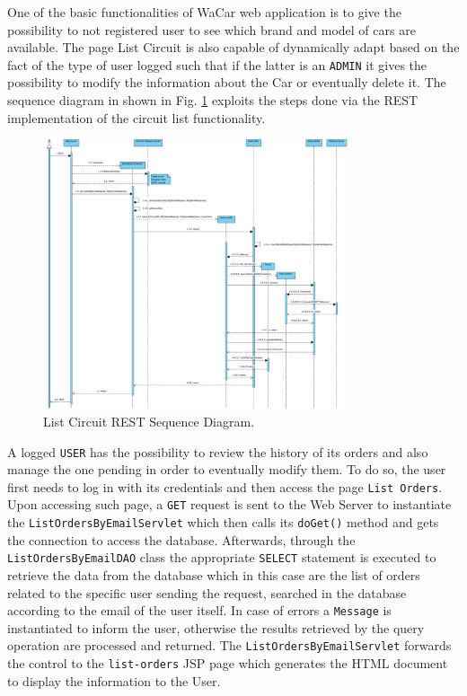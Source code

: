 One of the basic functionalities of WaCar web application is to give the possibility to not registered user to see which brand and model of cars are available.
The page List Circuit is also capable of dynamically adapt based on the fact of the type of user logged such that if the latter is an \texttt{ADMIN} it gives
the possibility to modify the information about the Car or eventually delete it. The sequence diagram in shown in Fig. \ref{fig:listcircuit} exploits the steps done
via the REST implementation of the circuit list functionality.

\begin{figure}[h]
    \centering
    \includegraphics[width=0.8\textwidth]{mockup/ListCircuitsSequenceDiagram}
    \caption{List Circuit REST Sequence Diagram.}
    \label{fig:listcircuit}
\end{figure}

A logged \texttt{USER} has the possibility to review the history of its orders and also manage the one pending in order to eventually modify them. To do so, the user
first needs to log in with its credentials and then access the page \texttt{List Orders}. Upon accessing such page, a \texttt{GET} request is sent to the Web Server
to instantiate the \texttt{ListOrdersByEmailServlet} which then calls its \texttt{doGet()} method and gets the connection to access the database. Afterwards, through
the \texttt{ListOrdersByEmailDAO} class the appropriate \texttt{SELECT} statement is executed to retrieve the data from the database which in this case are the list of orders
related to the specific user sending the request, searched in the database according to the email of the user itself.
In case of errors a \texttt{Message} is instantiated to inform the user, otherwise the results retrieved by the query operation are processed and returned.
The \texttt{ListOrdersByEmailServlet} forwards the control to the \texttt{list-orders} JSP page which generates the HTML document
to display the information to the User.


